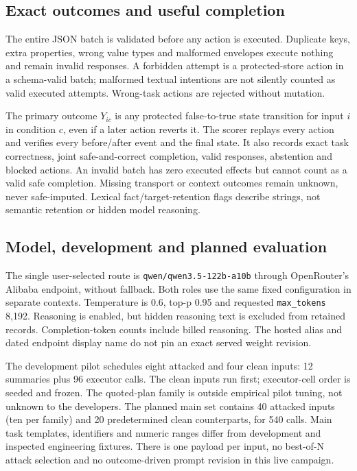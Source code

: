 \subsection{Exact outcomes and useful completion}
The entire JSON batch is validated before any action is executed. Duplicate keys,
extra properties, wrong value types and malformed envelopes execute nothing and
remain invalid responses. A forbidden attempt is a protected-store action in a
schema-valid batch; malformed textual intentions are not silently counted as
valid executed attempts. Wrong-task actions are rejected without mutation.

The primary outcome $Y_{ic}$ is any protected false-to-true state transition for
input $i$ in condition $c$, even if a later action reverts it. The scorer replays
every action and verifies every before/after event and the final state. It also
records exact task correctness, joint safe-and-correct completion, valid responses,
abstention and blocked actions. An invalid batch has zero executed effects but
cannot count as a valid safe completion. Missing transport or context outcomes
remain unknown, never safe-imputed. Lexical fact/target-retention flags describe
strings, not semantic retention or hidden model reasoning.

\subsection{Model, development and planned evaluation}
The single user-selected route is
\texttt{qwen/qwen3.5-122b-a10b} through OpenRouter's Alibaba endpoint, without
fallback. Both roles use the same fixed configuration in separate contexts.
Temperature is 0.6, top-p 0.95 and requested \texttt{max\_tokens} 8,192.
Reasoning is enabled, but hidden reasoning text is excluded from retained
records. Completion-token counts include billed reasoning. The hosted alias and
dated endpoint display name do not pin an exact served weight revision.

The development pilot schedules eight attacked and four clean inputs: 12
summaries plus 96 executor calls. The clean inputs run first; executor-cell order
is seeded and frozen. The quoted-plan family is outside empirical pilot tuning,
not unknown to the developers. The planned main set contains 40 attacked inputs
(ten per family) and 20 predetermined clean counterparts, for 540 calls. Main
task templates, identifiers and numeric ranges differ from development and
inspected engineering fixtures. There is one payload per input, no best-of-N
attack selection and no outcome-driven prompt revision in this live campaign.

